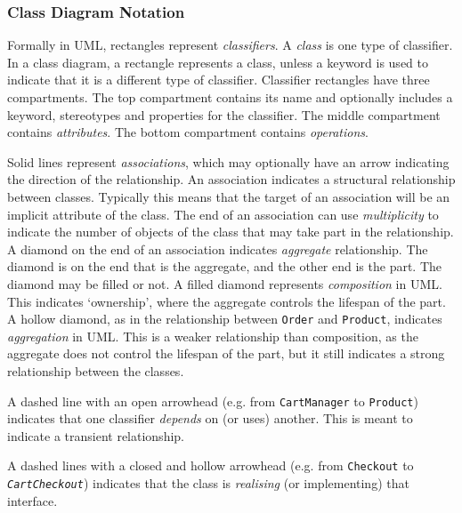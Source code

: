 \subsubsection{Class Diagram Notation}\label{sec:classNotation}
Formally in UML, rectangles represent \emph{classifiers}. A \emph{class} is one type of classifier.
In a class diagram, a rectangle represents a class, unless a keyword is used to indicate that it is a different type of classifier.
Classifier rectangles have three compartments.
The top compartment contains its name and optionally includes a keyword, stereotypes and properties for the classifier.
The middle compartment contains \emph{attributes}.
The bottom compartment contains \emph{operations}.

Solid lines represent \emph{associations}, which may optionally have an arrow indicating the direction of the relationship.
An association indicates a structural relationship between classes.
Typically this means that the target of an association will be an implicit attribute of the class.
The end of an association can use \emph{multiplicity} to indicate the number of objects of the class that may take part in the relationship.
A diamond on the end of an association indicates \emph{aggregate} relationship.
The diamond is on the end that is the aggregate, and the other end is the part.
The diamond may be filled or not. A filled diamond represents \emph{composition} in UML.
This indicates `ownership', where the aggregate controls the lifespan of the part.
A hollow diamond, as in the relationship between \texttt{Order} and \texttt{Product},
indicates \emph{aggregation} in UML.
This is a weaker relationship than composition, as the aggregate does not control the lifespan of the part,
but it still indicates a strong relationship between the classes.

A dashed line with an open arrowhead (e.g. from \texttt{CartManager} to \texttt{Product})
indicates that one classifier \emph{depends} on (or uses) another. This is meant to indicate a transient relationship.

A dashed lines with a closed and hollow arrowhead (e.g. from \texttt{Checkout} to \texttt{\textsl{CartCheckout}})
indicates that the class is \emph{realising} (or implementing) that interface.

